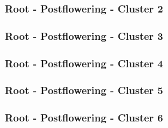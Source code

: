 

\clearpage

\subsubsection{Root - Postflowering - Cluster 2}

\vspace{1em}



\clearpage

\subsubsection{Root - Postflowering - Cluster 3}

\vspace{1em}



\clearpage

\subsubsection{Root - Postflowering - Cluster 4}

\vspace{1em}



\clearpage

\subsubsection{Root - Postflowering - Cluster 5}

\vspace{1em}



\clearpage

\subsubsection{Root - Postflowering - Cluster 6}

\vspace{1em}



